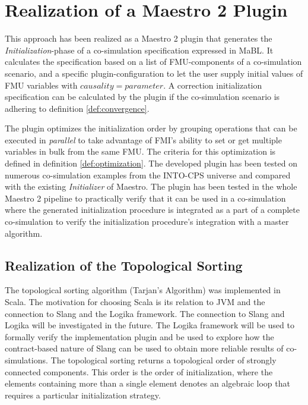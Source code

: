 \section{Realization of a Maestro 2 Plugin}\label{sc:implementation}
This approach has been realized as a Maestro 2 plugin that generates the \textit{Initialization}-phase of a co-simulation specification expressed in MaBL. It calculates the specification based on a list of FMU-components of a co-simulation scenario, and a specific plugin-configuration to let the user supply initial values of FMU variables with $causality=parameter$. A correction initialization specification can be calculated by the plugin if the co-simulation scenario is adhering to definition \ref{def:convergence}.

The plugin optimizes the initialization order by grouping operations that can be executed in \textit{parallel} to take advantage of FMI's ability to set or get multiple variables in bulk from the same FMU. The criteria for this optimization is defined in definition \ref{def:optimization}. 
The developed plugin has been tested on numerous co-simulation examples from the INTO-CPS universe\cite{Maestro} and compared with the existing \textit{Initializer} of Maestro. The plugin has been tested in the whole Maestro 2 pipeline to practically verify that it can be used in a co-simulation where the generated initialization procedure is integrated as a part of a complete co-simulation to verify the initialization procedure's integration with a master algorithm.

\subsection{Realization of the Topological Sorting}
The topological sorting algorithm (Tarjan's Algorithm) was implemented in Scala. The motivation for choosing Scala is its relation to JVM and the connection to Slang and the Logika framework\cite{inbook}. The connection to Slang and Logika will be investigated in the future. The Logika framework will be used to formally verify the implementation plugin and be used to explore how the contract-based nature of Slang can be used to obtain more reliable results of co-simulations. The topological sorting returns a topological order of strongly connected components. This order is the order of initialization, where the elements containing more than a single element denotes an algebraic loop that requires a particular initialization strategy. 


